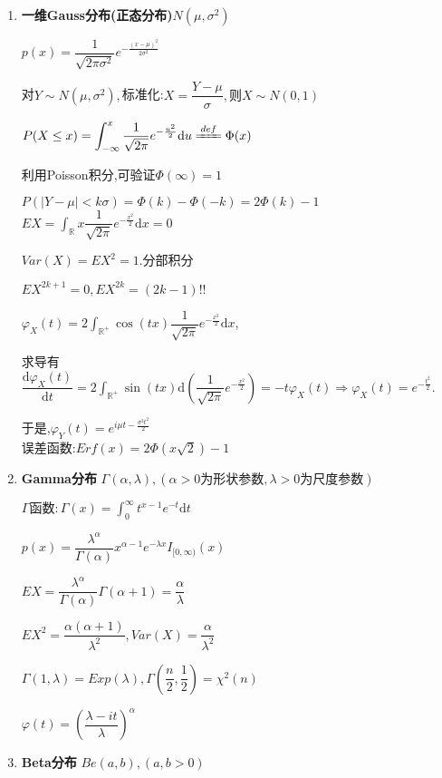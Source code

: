 \begin{enumerate}
      \item \textbf{一维Gauss分布(正态分布)}$N(\mu, \sigma^2)$

        $p(x) = \dfrac{1}{\sqrt{2\pi \sigma^2}}e^{-\frac{(x-\mu)^2}{2\sigma^2}}$

        对$Y\sim N(\mu, \sigma^2), $标准化:$X = \dfrac{Y - \mu}{\sigma},则 X\sim N(0,1)$

        $ P(X \le x) = \int_{-\infty}^{x}{\frac{1}{\sqrt{2\pi}}e^{-\frac{u^2}{2}}\mathrm{d}u} \xlongequal{def}\Phi(x)$

        利用Poisson积分,可验证$\Phi(\infty) = 1$

        $ P(|Y-\mu| < k\sigma) = \Phi(k) - \Phi(-k) = 2\Phi(k)-1$
        \\

        $EX = \int_{\mathbb{R}}{x\dfrac{1}{\sqrt{2\pi}}e^{-\frac{x^2}{2}}\mathrm{d}x} = 0$

        $ Var(X) = EX^2 = 1. 分部积分$

        $ EX^{2k+1} =0, EX^{2k} = (2k-1)!!$

        $\varphi_X(t) = 2\int_{\mathbb{R}^+}\cos(tx)\dfrac{1}{\sqrt{2\pi}}e^{-\frac{x^2}{2}}\mathrm{d}x$,

        求导有$ \dfrac{\mathrm{d}\varphi_X(t)}{\mathrm{d}t} = 2\int_{\mathbb{R}^+}\sin(tx)\mathrm{d}(\dfrac{1}{\sqrt{2\pi}}e^{-\frac{x^2}{2}})
        = -t\varphi_X(t)\Rightarrow \varphi_X(t) = e^{-\frac{t^2}{2}}$.

      于是,$ \varphi_Y(t) = e^{i\mu t-\frac{\sigma^2t^2}{2}}$
      \\

      误差函数:$ Erf(x) = 2\Phi(x\sqrt{2})-1$

    \item \textbf{Gamma分布} $\Gamma(\alpha, \lambda),(\alpha > 0为形状参数,\lambda>0为尺度参数)$

      $ \Gamma 函数: \Gamma(x) = \int_{0}^{\infty}t^{x-1}e^{-t}\mathrm{d}t$

      $ p(x) = \dfrac{\lambda^{\alpha}}{\Gamma(\alpha)}x^{\alpha - 1}e^{-\lambda x}I_{[0,\infty)}(x)$

      $ EX = \dfrac{\lambda^{\alpha}}{\Gamma(\alpha)}\Gamma(\alpha+1) = \dfrac{\alpha}{\lambda}$

      $ EX^2 = \dfrac{\alpha(\alpha+1)}{\lambda^2},Var(X) = \dfrac{\alpha}{\lambda^2}$

      $ \Gamma(1,\lambda )= Exp(\lambda), \Gamma(\dfrac{n}{2},\dfrac{1}{2}) = \chi ^2(n)$

      $ \varphi(t) = (\dfrac{\lambda-it}{\lambda})^{\alpha}$
    \item \textbf{Beta分布} $ Be(a,b),(a,b>0)$


\end{enumerate}
